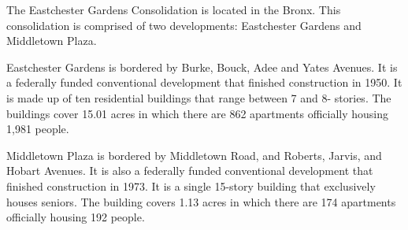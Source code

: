 The Eastchester Gardens Consolidation is located in the Bronx. This consolidation is comprised of two developments: Eastchester Gardens and Middletown Plaza.\par \vspace{.7\baselineskip}Eastchester Gardens is bordered by Burke, Bouck, Adee and Yates Avenues.  It is a federally funded conventional development that finished construction in 1950. It is made up of ten residential buildings that range between 7 and 8- stories. The buildings cover 15.01 acres in which there are 862 apartments officially housing 1,981 people.   \par \vspace{.7\baselineskip}  \par \vspace{.7\baselineskip}Middletown Plaza is bordered by Middletown Road, and Roberts, Jarvis, and Hobart Avenues. It is also a federally funded conventional development that finished construction in 1973. It is a single 15-story building that exclusively houses seniors. The building covers 1.13 acres in which there are 174 apartments officially housing 192 people.